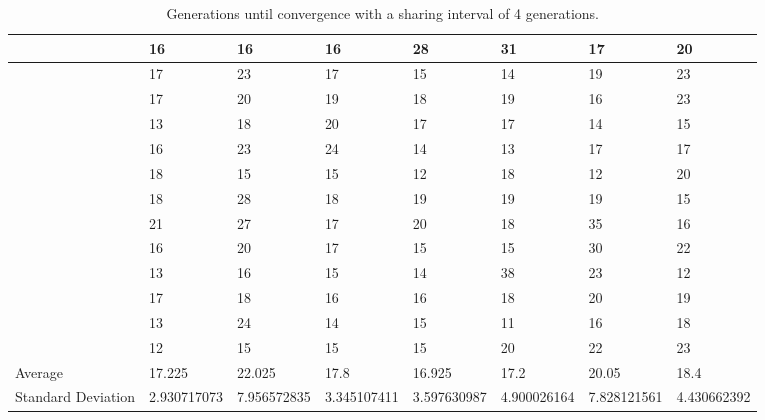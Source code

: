 \documentclass[12pt]{article} %
\begin{document}
\begin{sidewaystable}
\begin{tabular}{|l|l|l|l|l|l|l|l|}
    ~        & 16          & 16                         & 16          & 28          & 31          & 17          & 20          \\ \hline
    ~        & 17          & 23                         & 17          & 15          & 14          & 19          & 23          \\ \hline
    ~        & 17          & 20                         & 19          & 18          & 19          & 16          & 23          \\ \hline
    ~        & 13          & 18                         & 20          & 17          & 17          & 14          & 15          \\ \hline
    ~        & 16          & 23                         & 24          & 14          & 13          & 17          & 17          \\ \hline
    ~        & 18          & 15                         & 15          & 12          & 18          & 12          & 20          \\ \hline
    ~        & 18          & 28                         & 18          & 19          & 19          & 19          & 15          \\ \hline
    ~        & 21          & 27                         & 17          & 20          & 18          & 35          & 16          \\ \hline
    ~        & 16          & 20                         & 17          & 15          & 15          & 30          & 22          \\ \hline
    ~        & 13          & 16                         & 15          & 14          & 38          & 23          & 12          \\ \hline
    ~        & 17          & 18                         & 16          & 16          & 18          & 20          & 19          \\ \hline
    ~        & 13          & 24                         & 14          & 15          & 11          & 16          & 18          \\ \hline
    ~        & 12          & 15                         & 15          & 15          & 20          & 22          & 23          \\ \hline
    Average  & 17.225      & 22.025                     & 17.8        & 16.925      & 17.2        & 20.05       & 18.4        \\ \hline
    Standard Deviation       & 2.930717073 & 7.956572835                & 3.345107411 & 3.597630987 & 4.900026164 & 7.828121561 & 4.430662392 \\ \hline
    \end{tabular}
    \caption{Generations until convergence with a sharing interval of 4 generations.}
\end{sidewaystable}
\end{document}
